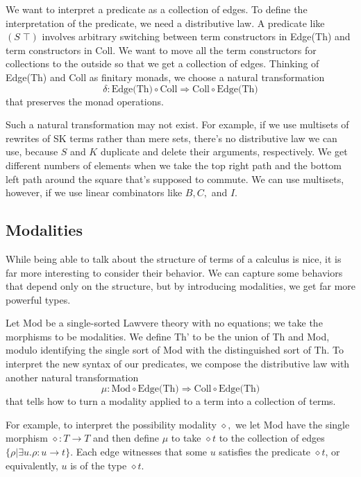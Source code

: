 \documentclass[submission,copyright,creativecommons]{eptcs}
\newcommand{\maps}{\colon}
\begin{document}
We want to interpret a predicate as a collection of edges.  To define the interpretation of the predicate, we need a distributive law.  A predicate like $(S\; \top)$ involves arbitrary switching between term constructors in Edge(Th) and term constructors in Coll.  We want to move all the term constructors for collections to the outside so that we get a collection of edges.  Thinking of Edge(Th) and Coll as finitary monads, we choose a natural transformation
\[ \delta\maps \mbox{Edge(Th)}\circ\mbox{Coll} \Rightarrow \mbox{Coll}\circ\mbox{Edge(Th)} \]
that preserves the monad operations.

Such a natural transformation may not exist.  For example, if we use multisets of rewrites of SK terms rather than mere sets, there's no distributive law we can use, because $S$ and $K$ duplicate and delete their arguments, respectively.  We get different numbers of elements when we take the top right path and the bottom left path around the square that's supposed to commute.  We can use multisets, however, if we use linear combinators like $B,C,$ and $I.$

\subsection{Modalities}

While being able to talk about the structure of terms of a calculus is nice, it is far more interesting to consider their behavior.  We can capture some behaviors that depend only on the structure, but by introducing modalities, we get far more powerful types.

Let Mod be a single-sorted Lawvere theory with no equations; we take the morphisms to be modalities.  We define Th' to be the union of Th and Mod, modulo identifying the single sort of Mod with the distinguished sort of Th.  To interpret the new syntax of our predicates, we compose the distributive law with another natural transformation
\[ \mu\maps \mbox{Mod} \circ \mbox{Edge(Th)} \Rightarrow \mbox{Coll}\circ\mbox{Edge(Th)} \]
that tells how to turn a modality applied to a term into a collection of terms.

For example, to interpret the possibility modality $\diamond,$ we let Mod have the single morphism $\diamond\maps T \to T$ and then define $\mu$ to take $\diamond t$ to the collection of edges $\{ \rho | \exists u. \rho\maps u \to t \}.$  Each edge witnesses that some $u$ satisfies the predicate $\diamond t$, or equivalently, $u$ is of the type $\diamond t.$
\end{document}
